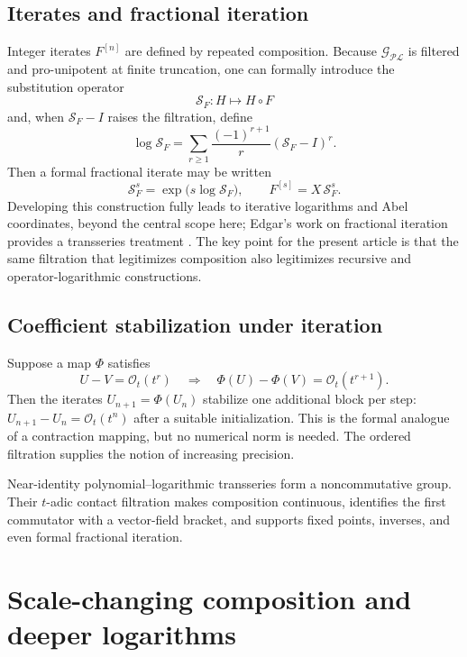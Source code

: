\documentclass[11pt,oneside]{book}
\theoremstyle{definition}
\theoremstyle{remark}
\newcommand{\PL}{\mathscr{PL}}
\newcommand{\bigO}{\mathcal O}
\newcommand{\compose}{\mathbin{\circ}}
\begin{document}
\section{Iterates and fractional iteration}
Integer iterates $F^{[n]}$ are defined by repeated composition.  Because
$\mathcal G_{\PL}$ is filtered and pro-unipotent at finite truncation, one can
formally introduce the substitution operator
\[
 \mathcal S_F:H\longmapsto H\compose F
\]
and, when $\mathcal S_F-I$ raises the filtration, define
\begin{equation}\label{eq:substitution-log}
 \log\mathcal S_F
 =\sum_{r\ge1}\frac{(-1)^{r+1}}r(\mathcal S_F-I)^r.
\end{equation}
Then a formal fractional iterate may be written
\[
 \mathcal S_F^s=\exp\bigl(s\log\mathcal S_F\bigr),
 \qquad
 F^{[s]}=X\,\mathcal S_F^s.
\]
Developing this construction fully leads to iterative logarithms and Abel
coordinates, beyond the central scope here; Edgar's work on fractional
iteration provides a transseries treatment \cite{EdgarFractional}.  The key
point for the present article is that the same filtration that legitimizes
composition also legitimizes recursive and operator-logarithmic constructions.

\section{Coefficient stabilization under iteration}
Suppose a map $\Phi$ satisfies
\begin{equation}\label{eq:contraction-general}
 U-V=\bigO_t(t^r)
 \quad\Longrightarrow\quad
 \Phi(U)-\Phi(V)=\bigO_t(t^{r+1}).
\end{equation}
Then the iterates $U_{n+1}=\Phi(U_n)$ stabilize one additional block per step:
$U_{n+1}-U_n=\bigO_t(t^n)$ after a suitable initialization.  This is the
formal analogue of a contraction mapping, but no numerical norm is needed.
The ordered filtration supplies the notion of increasing precision.

\begin{summarybox}
Near-identity polynomial--logarithmic transseries form a noncommutative group.
Their $t$-adic contact filtration makes composition continuous, identifies the
first commutator with a vector-field bracket, and supports fixed points,
inverses, and even formal fractional iteration.
\end{summarybox}


\chapter{Scale-changing composition and deeper logarithms}
\label{ch:composition-scale}
\end{document}
